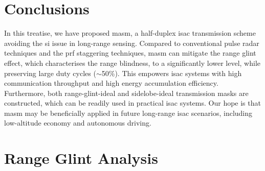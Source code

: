 \documentclass[journal,a4paper,10pt, romanappendices]{IEEEtran}
\begin{document}
\section{Conclusions}\label{sec:conclusion}
In this treatise, we have proposed \ac{masm}, a half-duplex \ac{isac} transmission scheme avoiding the \ac{si} issue in long-range sensing. Compared to conventional pulse radar techniques and the \ac{prf} staggering techniques, \ac{masm} can mitigate the range glint effect, which characterises the range blindness, to a significantly lower level, while preserving large duty cycles ($\sim$50\%). This empowers \ac{isac} systems with high communication throughput and high energy accumulation efficiency. Furthermore, both range-glint-ideal and sidelobe-ideal transmission masks are constructed, which can be readily used in practical \ac{isac} systems. Our hope is that \ac{masm} may be beneficially applied in future long-range \ac{isac} scenarios, including low-altitude economy and autonomous driving.

\appendices
\section{Range Glint Analysis}
\end{document}
